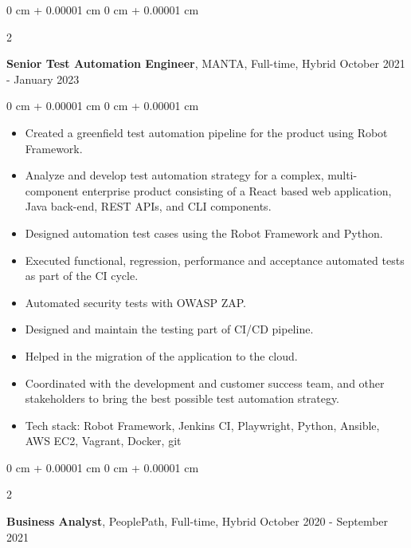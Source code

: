 \documentclass[10pt, letterpaper]{article}
\newenvironment{highlights}{
    \begin{itemize}[
        topsep=0.10 cm,
        parsep=0.10 cm,
        partopsep=0pt,
        itemsep=0pt,
        leftmargin=0 cm + 10pt
    ]
}{
    \end{itemize}
} %
\newenvironment{onecolentry}{
    \begin{adjustwidth}{
        0 cm + 0.00001 cm
    }{
        0 cm + 0.00001 cm
    }
}{
    \end{adjustwidth}
} %
\newenvironment{twocolentry}[2][]{
    \onecolentry
    \def\secondColumn{#2}
    \setcolumnwidth{\fill, 4.5 cm}
    \begin{paracol}{2}
}{
    \switchcolumn \raggedleft \secondColumn
    \end{paracol}
    \endonecolentry
} %
\begin{document}
        \vspace{0.2 cm}

        \begin{twocolentry}{
            October 2021 - January 2023
        }
            \textbf{Senior Test Automation Engineer}, MANTA, Full-time, Hybrid\end{twocolentry}

        \vspace{0.10 cm}
        \begin{onecolentry}
            \begin{highlights}
                \item Created a greenfield test automation pipeline for the product using Robot Framework.
                \item Analyze and develop test automation strategy for a complex, multi-component enterprise product consisting of a React based web application, Java back-end, REST APIs, and CLI components.
                \item Designed automation test cases using the Robot Framework and Python.
                \item Executed functional, regression, performance and acceptance automated tests as part of the CI cycle.
                \item Automated security tests with OWASP ZAP.
                \item Designed and maintain the testing part of CI/CD pipeline.
                \item Helped in the migration of the application to the cloud.
                \item Coordinated with the development and customer success team, and other stakeholders to bring the best possible test automation strategy.
                \item Tech stack: Robot Framework, Jenkins CI, Playwright, Python, Ansible, AWS EC2, Vagrant, Docker, git
            \end{highlights}
        \end{onecolentry}

        \vspace{0.2 cm}

        \begin{twocolentry}{
            October 2020 - September 2021
        }
            \textbf{Business Analyst}, PeoplePath, Full-time, Hybrid\end{twocolentry}
\end{document}
